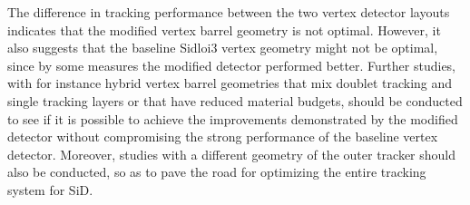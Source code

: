 The difference in tracking performance between the two vertex detector layouts
 indicates that the modified vertex barrel
geometry is not optimal.
However, it also suggests that the baseline Sidloi3 vertex geometry might not be optimal,
since by some measures the modified detector performed better.%
Further studies, with for instance hybrid vertex barrel geometries that mix
doublet tracking and single tracking layers or that have reduced material budgets,
should be conducted to see if it is possible to achieve the improvements demonstrated by
the modified detector without compromising the strong performance of the baseline %
 vertex detector.
Moreover, studies with a different geometry of the outer tracker should also be conducted, so as
to pave the road for optimizing the entire tracking system for SiD.
